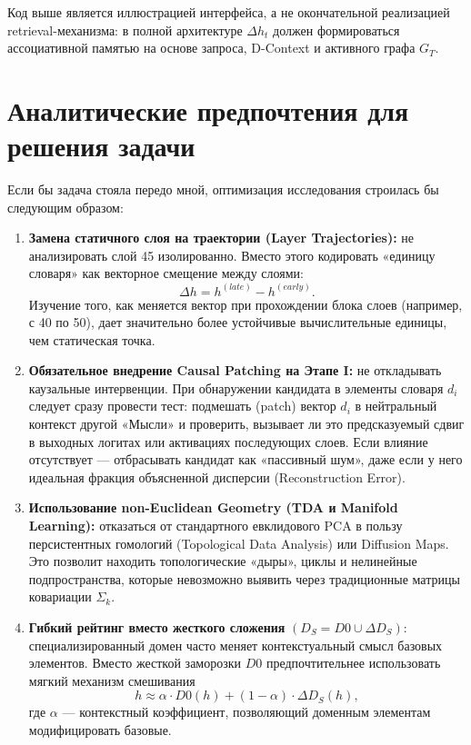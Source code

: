 \documentclass[11pt,a4paper]{article}
\begin{document}
Код выше является иллюстрацией интерфейса, а не окончательной реализацией retrieval-механизма: в полной архитектуре $\Delta h_t$ должен формироваться ассоциативной памятью на основе запроса, D-Context и активного графа $G_T$.

\iffalse
\section{Аналитические предпочтения для решения задачи}

Если бы задача стояла передо мной, оптимизация исследования строилась бы следующим образом:

\begin{enumerate}
    \item \textbf{Замена статичного слоя на траектории (Layer Trajectories):} не анализировать слой 45 изолированно. Вместо этого кодировать «единицу словаря» как векторное смещение между слоями:
    \[
    \Delta h = h^{(late)} - h^{(early)}.
    \]
    Изучение того, как меняется вектор при прохождении блока слоев (например, с 40 по 50), дает значительно более устойчивые вычислительные единицы, чем статическая точка.

    \item \textbf{Обязательное внедрение Causal Patching на Этапе I:} не откладывать каузальные интервенции. При обнаружении кандидата в элементы словаря $d_i$ следует сразу провести тест: подмешать (patch) вектор $d_i$ в нейтральный контекст другой «Мысли» и проверить, вызывает ли это предсказуемый сдвиг в выходных логитах или активациях последующих слоев. Если влияние отсутствует — отбрасывать кандидат как «пассивный шум», даже если у него идеальная фракция объясненной дисперсии (Reconstruction Error).

    \item \textbf{Использование non-Euclidean Geometry (TDA и Manifold Learning):} отказаться от стандартного евклидового PCA в пользу персистентных гомологий (Topological Data Analysis) или Diffusion Maps. Это позволит находить топологические «дыры», циклы и нелинейные подпространства, которые невозможно выявить через традиционные матрицы ковариации $\Sigma_k$.

    \item \textbf{Гибкий рейтинг вместо жесткого сложения} $(D_S = D0 \cup \Delta D_S)$: специализированный домен часто меняет контекстуальный смысл базовых элементов. Вместо жесткой заморозки $D0$ предпочтительнее использовать мягкий механизм смешивания
    \[
    h \approx \alpha \cdot D0(h) + (1-\alpha) \cdot \Delta D_S(h),
    \]
    где $\alpha$ — контекстный коэффициент, позволяющий доменным элементам модифицировать базовые.
\end{enumerate}
\end{document}
